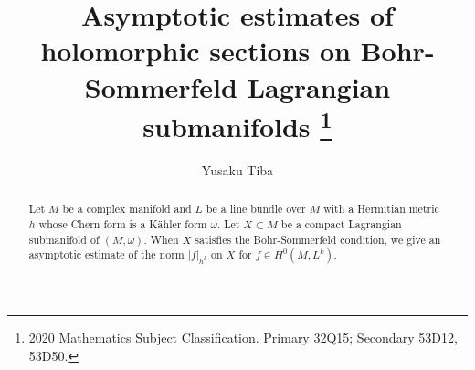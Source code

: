 \documentclass[12pt,oneside]{amsart}
\theoremstyle{plain}
\theoremstyle{definition}
\theoremstyle{remark}
\begin{document}
\title
[Asymptotic estimates of holomorphic sections]
{Asymptotic estimates of holomorphic sections on Bohr-Sommerfeld Lagrangian submanifolds
\footnote{2020 Mathematics Subject Classification. Primary 32Q15; Secondary 53D12, 53D50.
}}
\author{Yusaku Tiba}
\date{}

\begin{abstract}
Let $M$ be a complex manifold and 
$L$ be a line bundle over $M$ with a Hermitian metric $h$ whose Chern form is a K\"ahler form $\omega$.  
Let $X \subset M$ be a compact Lagrangian submanifold of $(M, \omega)$.  
When $X$ satisfies the Bohr-Sommerfeld condition, 
we give an asymptotic estimate of the norm $|f|_{h^k}$ on $X$ for $f \in H^0(M, L^k)$.  
\end{abstract}

\maketitle


\end{document}
